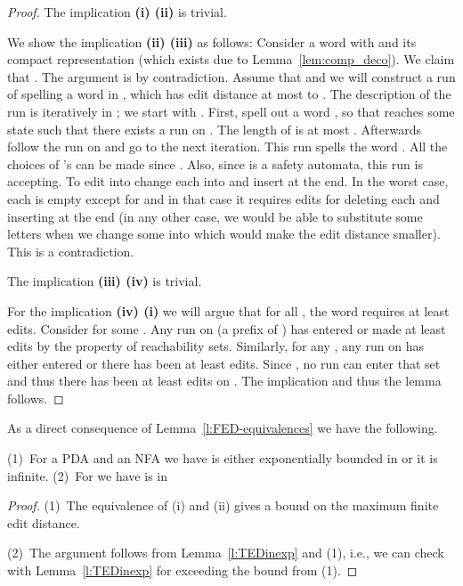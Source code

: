 \documentclass{CSML}
\begin{document}
\begin{proof}
The implication \textbf{(i)  (ii)} is trivial.

We show the implication \textbf{(ii)  (iii)} as follows: Consider a word  with 
 and its 
compact  representation  (which exists due to Lemma~\ref{lem:comp_deco}).
We claim that .
The argument is by contradiction. Assume that  and we will construct a run of  spelling a word  in , which has edit distance at most  to .
The description of the run is iteratively in ; we start with .
First, spell out a word , so that  reaches some state  such that there exists a run on . The length of  is at most . Afterwards follow the run on  and go to the next iteration. This run spells the word . All the choices of 's can be made since .
Also, since  is a safety automata, this run is accepting.
To edit  into  change each  into  and insert  at the end. In the worst case, each  is empty except for  and in that case it requires   edits for deleting each  and inserting  at the end (in any other case, we would be able to substitute some letters when we change some  into  which would make the edit distance smaller). This is a contradiction. 

The implication \textbf{(iii)  (iv)} is trivial.

For the implication \textbf{(iv)  (i)} we will argue that for all , the word  requires at least  edits.
Consider  for some .
Any run on  (a prefix of ) has entered  or made at least  edits by the property of reachability sets. Similarly, for any , any run on  has either entered  or there has been at least  edits. Since  , no run can enter that set and thus there has been at least  edits on . The implication and thus the lemma follows.
\end{proof}

As a direct consequence of Lemma~\ref{l:FED-equivalences} we have the following.

\begin{thm}
(1)~For a PDA  and an NFA  we have  is either exponentially bounded in 
 or it is infinite.
(2)~For  we have  is in 
\end{thm}
\begin{proof}
(1)~The equivalence of (i) and (ii) gives a bound on the maximum finite edit distance. 

(2)~The argument follows from Lemma~\ref{l:TEDinexp} and (1), i.e., we can check with
Lemma~\ref{l:TEDinexp}  for  exceeding the bound from (1). 
\end{proof}
\end{document}
